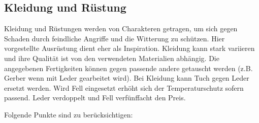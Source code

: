 \documentclass{article}
\begin{document}
\begin{center}
\subsection{Kleidung und Rüstung}
\end{center}

Kleidung und Rüstungen werden von Charakteren getragen, um sich gegen Schaden durch feindliche Angriffe und die
Witterung zu schützen. Hier vorgestellte Ausrüstung dient eher als Inspiration. Kleidung kann stark variieren und
ihre Qualität ist von den verwendeten Materialien abhängig. Die angegebenen Fertigkeiten können gegen passende andere
getauscht werden (z.B. Gerber wenn mit Leder gearbeitet wird).
Bei Kleidung kann Tuch gegen Leder ersetzt werden. Wird Fell eingesetzt erhöht sich der Temperaturschutz sofern
passend. Leder verdoppelt und Fell verfünffacht den Preis.

Folgende Punkte sind zu berücksichtigen:
\end{document}
